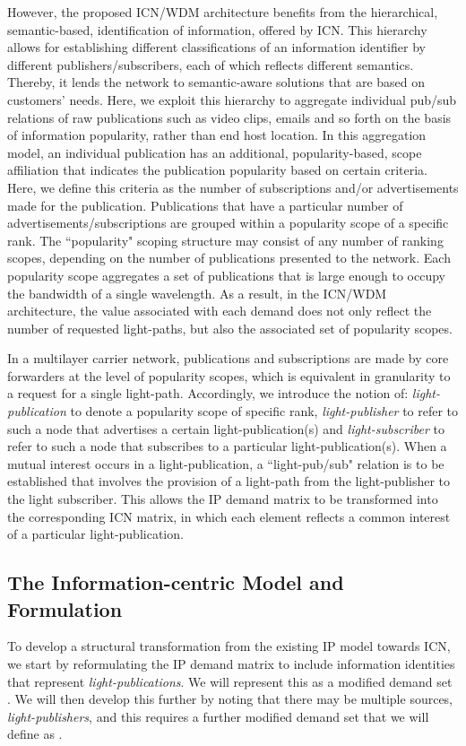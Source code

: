 \documentclass[journal]{IEEEtran}
\begin{document}
However, the proposed ICN/WDM architecture benefits from the hierarchical, semantic-based, identification of information, offered by ICN. This hierarchy allows for establishing different classifications of an information identifier by different publishers/subscribers, each of which reflects different semantics. Thereby, it lends the network to semantic-aware solutions that are based on customers' needs. 
Here, we exploit this hierarchy to aggregate individual pub/sub relations of raw publications such as video clips, emails and so forth on the basis of information popularity, rather than end host location.
In this aggregation model, an individual publication has an additional, popularity-based, scope affiliation that indicates the publication popularity based on certain criteria. Here, we define this criteria as the number of subscriptions and/or advertisements made for the publication. Publications that have a particular number of advertisements/subscriptions are grouped within a popularity scope of a specific rank. The ``popularity" scoping structure may consist of any number of ranking scopes, depending on the number of publications presented to the network. Each popularity scope aggregates a set of publications that is large enough to occupy the bandwidth of a single wavelength. As a result, in the ICN/WDM architecture, the value associated with each demand does not only reflect the number of requested light-paths, but also the associated set of popularity scopes.

In a multilayer carrier network, publications and subscriptions are made by core forwarders at the level of popularity scopes, which is equivalent in granularity to a request for a single light-path. Accordingly, we introduce the notion of: \emph{light-publication} to denote a popularity scope of specific rank, \emph{light-publisher} to refer to such a node that advertises a certain light-publication(s) and \emph{light-subscriber} to refer to such a node that subscribes to a particular light-publication(s). When a mutual interest occurs in a light-publication, a ``light-pub/sub" relation is to be established that involves the provision of a light-path from the light-publisher to the light subscriber.
This allows the IP demand matrix to be transformed into the corresponding ICN matrix, in which each element reflects a common interest of a particular light-publication.

 \subsection{The Information-centric Model and Formulation}\label{sec:icnmodel} 
To develop a structural transformation from the existing IP model
towards ICN, we start by reformulating the IP demand matrix to include
information identities that represent \emph{light-publications}. We
will represent this as a modified demand set . We will then develop
this further by noting that there may be multiple sources,
\emph{light-publishers}, and this requires a further modified demand
set that we will define as .
\end{document}
